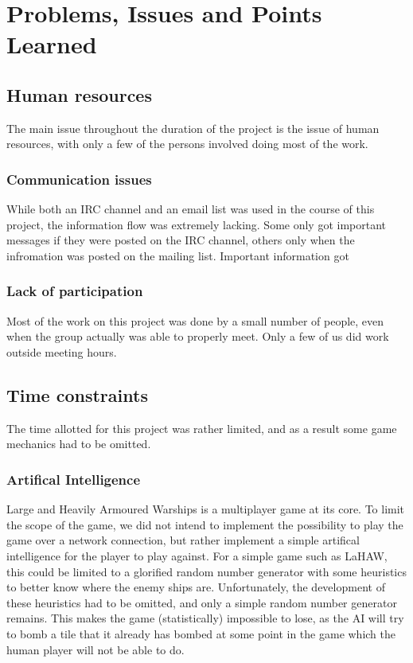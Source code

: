 \chapter{Problems, Issues and Points Learned}
\label{cha:problems_issues_and_points_learned}



\section{Human resources}
The main issue throughout the duration of the project is the issue of human resources, with only a few of the persons involved doing most of the work.



\subsection{Communication issues}
While both an IRC channel and an email list was used in the course of this project, the information flow was extremely lacking. Some only got important messages if they were posted on the IRC channel, others only when the infromation was posted on the mailing list. Important information got 


\subsection{Lack of participation}
Most of the work on this project was done by a small number of people, even when the group actually was able to properly meet. Only a few of us did work outside meeting hours.



\section{Time constraints}
The time allotted for this project was rather limited, and as a result some game mechanics had to be omitted.


\subsection{Artifical Intelligence}
Large and Heavily Armoured Warships is a multiplayer game at its core. To limit the scope of the game, we did not intend to implement the possibility to play the game over a network connection, but rather implement a simple artifical intelligence for the player to play against. For a simple game such as LaHAW, this could be limited to a glorified random number generator with some heuristics to better know where the enemy ships are. Unfortunately, the development of these heuristics had to be omitted, and only a simple random number generator remains. This makes the game (statistically) impossible to lose, as the AI will try to bomb a tile that it already has bombed at some point in the game which the human player will not be able to do.

